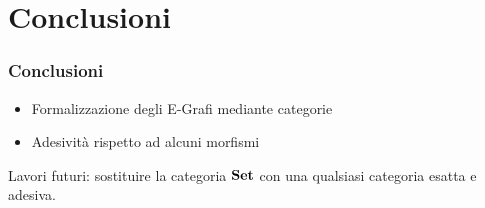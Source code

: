 \documentclass[8pt]{beamer}
\begin{document}
\section{Conclusioni}
\begin{frame}\frametitle{Conclusioni}
	\begin{itemize}
		\item Formalizzazione degli E-Grafi mediante categorie
		\item Adesività rispetto ad alcuni morfismi
	\end{itemize}

	Lavori futuri: sostituire la categoria $\mathbf{Set}$ con una qualsiasi categoria esatta e adesiva.
\end{frame}
\end{document}

